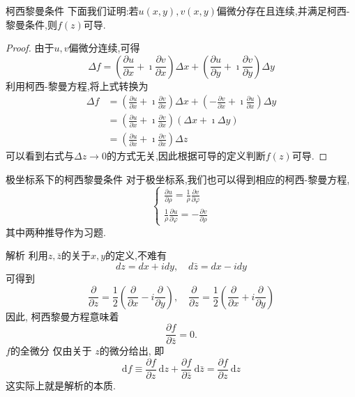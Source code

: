 \documentclass[fontset=windows, chinese, 10pt]{beamer}
\begin{document}
\begin{frame}{柯西黎曼条件}
  \small  下面我们证明:若$u(x,y), v(x,y)$偏微分存在且连续,并满足柯西-黎曼条件,则$f(z)$可导.
  \begin{proof}
      由于$u,v$偏微分连续,可得
      \[
          \Delta f=\left(\frac{\partial u}{\partial x}+\imath \frac{\partial v}{\partial x}\right) \Delta x+\left(\frac{\partial u}{\partial y}+ \imath \frac{\partial v}{\partial y}\right) \Delta y
      \]
      利用柯西-黎曼方程,将上式转换为
      \[
          \begin{aligned}
          \Delta f & =\left(\frac{\partial u}{\partial x}+ \imath \frac{\partial v}{\partial x}\right) \Delta x+\left(-\frac{\partial v}{\partial x}+ \imath\frac{\partial u}{\partial x}\right) \Delta y \\
          & =\left(\frac{\partial u}{\partial x}+ \imath \frac{\partial v}{\partial x}\right)(\Delta x+ \imath \Delta y) 
          \\
          & = \left(\frac{\partial u}{\partial x}+ \imath \frac{\partial v}{\partial x}\right) \Delta z
          \end{aligned}
      \]
  可以看到右式与$\Delta z\to 0$的方式无关,因此根据可导的定义判断$f(z)$可导.
\end{proof}

\end{frame}
\begin{frame}{极坐标系下的柯西黎曼条件}
  对于极坐标系,我们也可以得到相应的柯西-黎曼方程,
  \begin{equation}
      \left\{\begin{array}{l}
      \frac{\partial u}{\partial \rho}=\frac{1}{\rho} \frac{\partial v}{\partial \varphi} \\
      \frac{1}{\rho} \frac{\partial u}{\partial \varphi}=-\frac{\partial v}{\partial \rho}
      \end{array}\right.
      \end{equation}
  其中两种推导作为习题.
\end{frame}


\begin{frame}{解析}
  利用$z,\bar{z}$的关于$x,y$的定义,不难有
  \begin{equation}
      d z=d x+i d y, \quad d \bar{z}=d x-i d y
  \end{equation}
  可得到
  \begin{equation}
      \frac{\partial}{\partial z}=\frac{1}{2}\left(\frac{\partial}{\partial x}-i \frac{\partial}{\partial y}\right), \quad \frac{\partial}{\partial z}=\frac{1}{2}\left(\frac{\partial}{\partial x}+i \frac{\partial}{\partial y}\right)
  \end{equation}
  因此, 柯西黎曼方程意味着
  \begin{equation}
      \frac{\partial f}{\partial \bar{z}}=0.
  \end{equation}
  $f$的全微分 仅由关于 $z$的微分给出, 即
  \begin{equation}
  \mathrm{d}f \equiv \frac{\partial f}{\partial z} \mathrm{~d} z+\frac{\partial f}{\partial \bar{z}} \mathrm{~d} \bar{z}=\frac{\partial f}{\partial z} \mathrm{~d} z
  \end{equation}
  这实际上就是解析的本质.
\end{frame}
\end{document}
